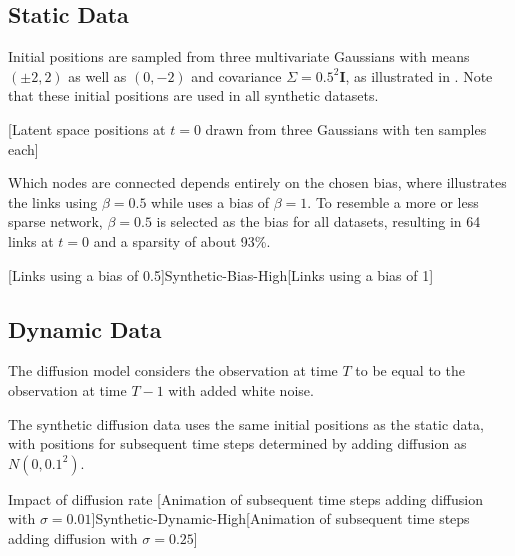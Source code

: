    \subsection{Static Data}
    
        Initial positions are sampled from three multivariate Gaussians with means $(\pm2,2)$ as well as $(0,-2)$ and covariance $\Sigma=0.5^2\bm{I}$, as illustrated in . Note that these initial positions are used in all synthetic datasets.

        [Latent space positions at $t=0$ drawn from three Gaussians with ten samples each]
    
        Which nodes are connected depends entirely on the chosen bias, where  illustrates the links using $\beta=0.5$ while  uses a bias of $\beta=1$. To resemble a more or less sparse network, $\beta=0.5$ is selected as the bias for all datasets, resulting in 64 links at $t=0$ and a sparsity of about 93\%.
        
        [Links using a bias of 0.5]{Synthetic-Bias-High}[Links using a bias of 1]
    
        
    
    \subsection{Dynamic Data}
    
        The diffusion model considers the observation at time $T$ to be equal to the observation at time $T-1$ with added white noise.
    
        The synthetic diffusion data uses the same initial positions as the static data, with positions for subsequent time steps determined by adding diffusion as $N(0,0.1^2)$. 
        
        
        
        Impact of diffusion rate
        [Animation of subsequent time steps adding diffusion with $\sigma=0.01$]{Synthetic-Dynamic-High}[Animation of subsequent time steps adding diffusion with $\sigma=0.25$]
    
